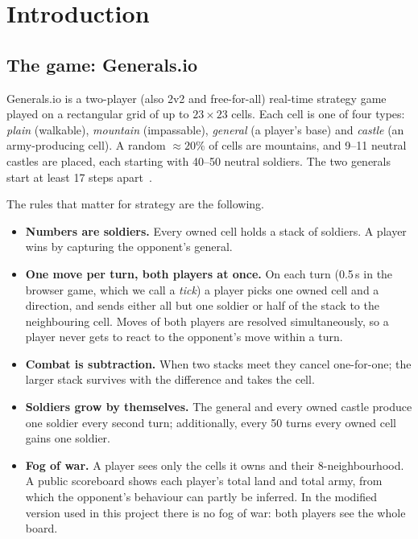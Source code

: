 \section{Introduction}

\subsection{The game: Generals.io}

Generals.io is a two-player (also 2v2 and free-for-all) real-time strategy game played on a rectangular
grid of up to $23\times 23$ cells. Each cell is one of four types: \emph{plain} (walkable), \emph{mountain}
(impassable), \emph{general} (a player's base) and \emph{castle} (an army-producing cell). A random
$\approx 20\%$ of cells are mountains, and 9--11 neutral castles are placed, each starting with 40--50
neutral soldiers. The two generals start at least 17 steps apart~\cite{straka}.

The rules that matter for strategy are the following.
\begin{itemize}
\item \textbf{Numbers are soldiers.} Every owned cell holds a stack of soldiers. A player wins by capturing
the opponent's general.
\item \textbf{One move per turn, both players at once.} On each turn (0.5\,s in the browser game, which we
call a \emph{tick}) a player picks one owned cell and a direction, and sends either all but one soldier or
half of the stack to the neighbouring cell. Moves of both players are resolved simultaneously, so a player
never gets to react to the opponent's move within a turn.
\item \textbf{Combat is subtraction.} When two stacks meet they cancel one-for-one; the larger stack
survives with the difference and takes the cell.
\item \textbf{Soldiers grow by themselves.} The general and every owned castle produce one soldier every
second turn; additionally, every 50 turns every owned cell gains one soldier.
\item \textbf{Fog of war.} A player sees only the cells it owns and their 8-neighbourhood. A public
scoreboard shows each player's total land and total army, from which the opponent's behaviour can partly
be inferred. In the modified version used in this project there is no fog of war: both players see the
whole board.
\end{itemize}

